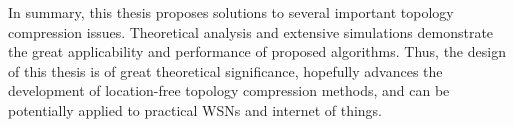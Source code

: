 \begin{eabstract}
In summary, this thesis proposes solutions to several important topology compression issues. Theoretical analysis and extensive simulations demonstrate the great applicability and performance of proposed algorithms. Thus, the design of this thesis is of great theoretical significance, hopefully advances the development of location-free topology compression methods, and can be potentially applied to practical WSNs and internet of things.
\end{eabstract}

